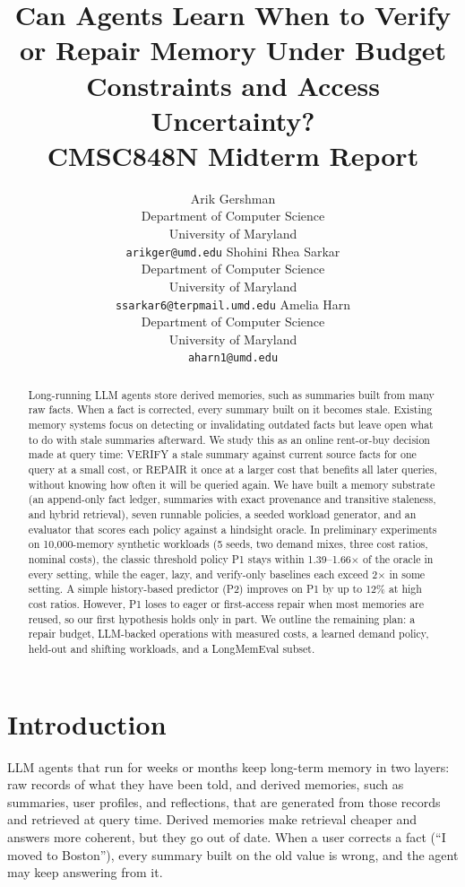 \documentclass{article}
\title{Can Agents Learn When to Verify or Repair Memory Under Budget Constraints and Access Uncertainty?\\\large CMSC848N Midterm Report}
\author{%
  Arik Gershman \\
  Department of Computer Science \\
  University of Maryland\\
  \texttt{arikger@umd.edu}
  \And
  Shohini Rhea Sarkar \\
  Department of Computer Science \\
  University of Maryland\\
  \texttt{ssarkar6@terpmail.umd.edu}
  \And
  Amelia Harn \\
  Department of Computer Science \\
  University of Maryland\\
  \texttt{aharn1@umd.edu}
}
\begin{document}
\maketitle

\begin{abstract}
Long-running LLM agents store derived memories, such as summaries built from
many raw facts. When a fact is corrected, every summary built on it becomes
stale. Existing memory systems focus on detecting or invalidating outdated
facts but leave open what to do with stale summaries afterward. We study this
as an online rent-or-buy decision made at query time: VERIFY a stale summary
against current source facts for one query at a small cost, or REPAIR it once
at a larger cost that benefits all later queries, without knowing how often it
will be queried again. We have built a memory substrate (an append-only fact
ledger, summaries with exact provenance and transitive staleness, and hybrid
retrieval), seven runnable policies, a seeded workload generator, and an evaluator that scores each policy against a hindsight oracle. In
preliminary experiments on 10,000-memory synthetic workloads (5 seeds, two
demand mixes, three cost ratios, nominal costs), the classic threshold policy
P1 stays within 1.39--1.66$\times$ of the oracle in every setting, while
the eager, lazy, and verify-only baselines each exceed 2$\times$ in some
setting. A simple history-based predictor (P2) improves on P1 by up to 12\% at
high cost ratios. However, P1 loses to eager or first-access repair when most
memories are reused, so our first hypothesis holds only in part. We outline the remaining plan:
a repair budget, LLM-backed operations with measured costs, a learned demand
policy, held-out and shifting workloads, and a LongMemEval subset.
\end{abstract}

\section{Introduction}

LLM agents that run for weeks or months keep long-term memory in two layers:
raw records of what they have been told, and derived memories, such as
summaries, user profiles, and reflections, that are generated from those
records and retrieved at query time. Derived memories make retrieval cheaper
and answers more coherent, but they go out of date. When a user corrects a
fact (``I moved to Boston''), every summary built on the old value is wrong,
and the agent may keep answering from it.
\end{document}
